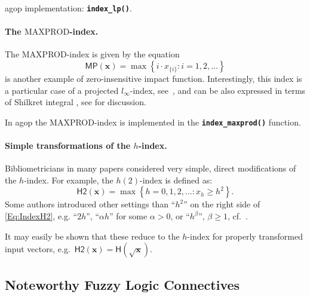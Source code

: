 \documentclass[11pt]{article}\usepackage[]{graphicx}\usepackage[]{color}
\newcommand{\hlkwd}[1]{\textcolor[rgb]{0.737,0.353,0.396}{\textbf{#1}}}%
\newcommand{\package}[1]{\textsf{#1}\xspace}
\newcommand{\Rfunc}[1]{\texttt{\hlkwd{#1}}}
\newcommand{\vect}[1]{{\mathbf{#1}}}
\newcommand{\func}[1]{{\mathsf{#1}}}
\theoremstyle{remark}
\theoremstyle{definition}
\begin{document}
\package{agop} implementation: \index{\Rfunc{index\_lp()}}\Rfunc{index\_lp()}.



\paragraph{The $\mathrm{MAXPROD}$-index.}
The MAXPROD-index \cite{Kosmulski2007:maxprod} is given  by the equation
\begin{equation*}\label{Eq:IndexMaxProd}
   \func{MP}(\vect{x}) = \max\left\{i\cdot{{x}}_{\{i\}}: i=1,2,\ldots\right\}
\end{equation*}
is another example of zero-insensitive impact function.
Interestingly, this index is a particular case of a projected $l_\infty$-index,
see~\cite{GagolewskiGrzegorzewski2009:geometricapproach}, and can be also expressed
in terms of Shilkret integral \cite{Shilkret1971:maxitivemeasure},
see \cite{GagolewskiMesiar2014:integrals} for discussion.

In \package{agop} the MAXPROD-index is implemented
in the \index{\Rfunc{index\_maxprod()}}\Rfunc{index\_maxprod()} function.



\paragraph{Simple transformations of the $h$-index.}
Bibliometricians in many papers considered very
simple, direct modifications of the $h$-index.
For example, the $h(2)$-index \cite{Kosmulski2006:h2}
is defined as:
\begin{equation*}\label{Eq:IndexH2}
\func{H2}(\vect{x}) = \max\left\{h=0,1,2,\ldots: {x}_{h} \ge h^2\right\}. %
\end{equation*}
Some authors introduced other settings than ``$h^2$'' on the right
side of \eqref{Eq:IndexH2}, e.g. ``$2h$'', ``$\alpha h$'' for some
$\alpha > 0$, or ``$h^\beta$'', $\beta\ge 1$, cf.~\cite{AlonsoETAL2009:hreview}.

It may easily be shown that these reduce to the $h$-index for
properly transformed input vectors,
e.g.~$\func{H2}(\vect{x})=\func{H}(\sqrt{\vect{x}})$.



\subsection{Noteworthy Fuzzy Logic Connectives}
\end{document}
